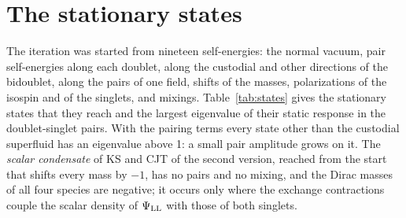 \documentclass[aps,prd,onecolumn,superscriptaddress,nofootinbib,floatfix,longbibliography]{revtex4-2}
\newcommand{\LL}{{\rm LL}}
\begin{document}
\section{The stationary states}
\label{sec:states}

The iteration was started from nineteen self-energies: the normal vacuum, pair self-energies along each doublet, along
the custodial and other directions of the bidoublet, along the pairs of one field, shifts of the masses, polarizations of
the isospin and of the singlets, and mixings. Table~\ref{tab:states} gives the stationary states that they reach and the
largest eigenvalue of their static response in the doublet-singlet pairs. With the pairing terms every state other than
the custodial superfluid has an eigenvalue above 1: a small pair amplitude grows on it. The \emph{scalar condensate} of
KS and CJT of the second version, reached from the start that shifts every mass by $-1$, has no pairs and no mixing, and
the Dirac masses of all four species are negative; it occurs only where the exchange contractions couple the scalar
density of $\Psi_\LL$ with those of both singlets.
\end{document}
